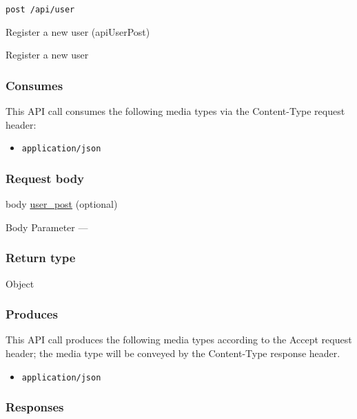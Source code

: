 \protect\hypertarget{apiUserPost}{}{}

\begin{verbatim}
post /api/user
\end{verbatim}

Register a new user ({apiUserPost})

Register a new user

\hypertarget{consumes-56}{%
\subsubsection{Consumes}\label{consumes-56}}

This API call consumes the following media types via the {Content-Type}
request header:

\begin{itemize}
\tightlist
\item
  \texttt{application/json}
\end{itemize}

\hypertarget{request-body-56}{%
\subsubsection{Request body}\label{request-body-56}}

body \protect\hyperlink{user_post}{user\_post} (optional)

{Body Parameter} ---

\hypertarget{return-type-136}{%
\subsubsection{Return type}\label{return-type-136}}

Object

\hypertarget{produces-173}{%
\subsubsection{Produces}\label{produces-173}}

This API call produces the following media types according to the
{Accept} request header; the media type will be conveyed by the
{Content-Type} response header.

\begin{itemize}
\tightlist
\item
  \texttt{application/json}
\end{itemize}

\hypertarget{responses-179}{%
\subsubsection{Responses}\label{responses-179}}

